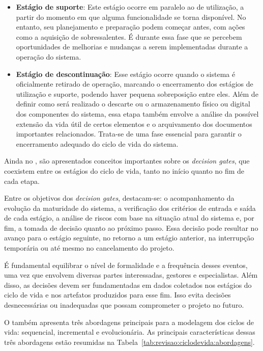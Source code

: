 \begin{itemize}
		\item \textbf{Estágio de suporte}: Este estágio ocorre em paralelo ao de utilização, a partir do momento em que alguma funcionalidade se torna disponível. No entanto, seu planejamento e preparação podem começar antes, com ações como a aquisição de sobressalentes. É durante essa fase que se percebem oportunidades de melhorias e mudanças a serem implementadas durante a operação do sistema.

		\item \textbf{Estágio de descontinuação}: Esse estágio ocorre quando o sistema é oficialmente retirado de operação, marcando o encerramento dos estágios de utilização e suporte, podendo haver pequena sobreposição entre eles. Além de definir como será realizado o descarte ou o armazenamento físico ou digital dos componentes do sistema, essa etapa também envolve a análise da possível extensão da vida útil de certos elementos e o arquivamento dos documentos importantes relacionados. Trata-se de uma fase essencial para garantir o encerramento adequado do ciclo de vida do sistema.
	\end{itemize}

	
	Ainda no \cite{incoseHandbook}, são apresentados conceitos importantes sobre os \textit{decision gates}, que coexistem entre os estágios do ciclo de vida, tanto no início quanto no fim de cada etapa. 

	Entre os objetivos dos \textit{decision gates}, destacam-se: o acompanhamento da evolução da maturidade do sistema, a verificação dos critérios de entrada e saída de cada estágio, a análise de riscos com base na situação atual do sistema e, por fim, a tomada de decisão quanto ao próximo passo. Essa decisão pode resultar no avanço para o estágio seguinte, no retorno a um estágio anterior, na interrupção temporária ou até mesmo no cancelamento do projeto.

	É fundamental equilibrar o nível de formalidade e a frequência desses eventos, uma vez que envolvem diversas partes interessadas, gestores e especialistas. Além disso, as decisões devem ser fundamentadas em dados coletados nos estágios do ciclo de vida e nos artefatos produzidos para esse fim. Isso evita decisões desnecessárias ou inadequadas que possam comprometer o projeto no futuro.

	O \cite{incoseHandbook} também apresenta três abordagens principais para a modelagem dos ciclos de vida: sequencial, incremental e evolucionária. As principais características dessas três abordagens estão resumidas na Tabela~\ref{tab:revisao:ciclodevida:abordagens}.

